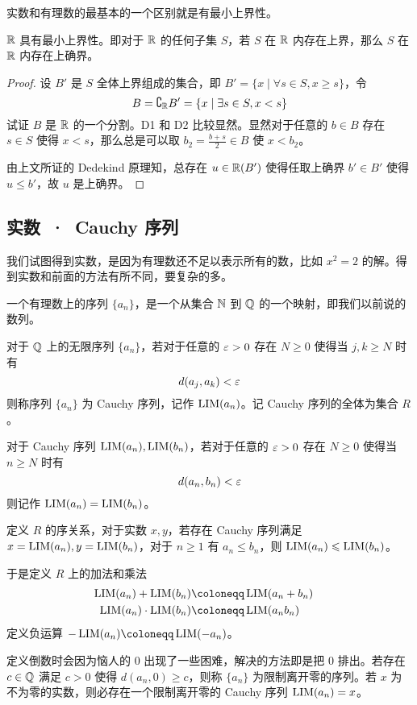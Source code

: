 实数和有理数的最基本的一个区别就是有最小上界性。

\begin{theorem}[确界原理]
	$\mathbb{R}$ 具有最小上界性。即对于 $\mathbb{R}$ 的任何子集 $S$，若 $S$ 在 $\mathbb{R}$ 内存在上界，那么 $S$ 在 $\mathbb{R}$ 内存在上确界。
\end{theorem}
\begin{proof}
	设 $B'$ 是 $S$ 全体上界组成的集合，即 $B' = \{x \mid\forall s \in S, x \geqslant s \}$，令
	\[ B = \complement_{\mathbb{R}} B' = \{ x \mid \exists s \in S, x < s\} \]
	试证 $B$ 是 $\mathbb{R}$ 的一个分割。D1 和 D2 比较显然。显然对于任意的 $b \in B$ 存在 $s \in S$ 使得 $x < s$，那么总是可以取 $b_2 = \frac{b+s}{2} \in B$ 使 $x < b_2$。

	由上文所证的 Dedekind 原理知，总存在 $u \in \mathbb{R}(B')$ 使得任取上确界 $b' \in B'$ 使得 $u \leqslant b'$，故 $u$ 是上确界。
\end{proof}

\subsection{实数\ ·\ Cauchy 序列}

我们试图得到实数，是因为有理数还不足以表示所有的数，比如 $x^2=2$ 的解。得到实数和前面的方法有所不同，要复杂的多。

一个有理数上的序列 $\{a_n\}$，是一个从集合 $\mathbb{N}$ 到 $\mathbb{Q}$ 的一个映射，即我们以前说的数列。

对于 $\mathbb{Q}$ 上的无限序列 $\{a_n\}$，若对于任意的 $\varepsilon > 0$ 存在 $N \geqslant 0$ 使得当 $j,k \geqslant N$ 时有
$$d(a_j,a_k) < \varepsilon$$
则称序列 $\{a_n\}$ 为 Cauchy 序列，记作 $\operatorname{{LIM}}(a_n)$。记 Cauchy 序列的全体为集合 $R$。

对于 Cauchy 序列 $\operatorname{{LIM}}(a_n),\operatorname{{LIM}}(b_n)$，若对于任意的 $\varepsilon > 0$ 存在 $N \geqslant 0$ 使得当 $n \geqslant N$ 时有
$$d(a_n,b_n) < \varepsilon$$
则记作 $\operatorname{{LIM}}(a_n) = \operatorname{{LIM}}(b_n)$。

定义 $R$ 的序关系，对于实数 $x,y$，若存在 Cauchy 序列满足 $x=\operatorname{{LIM}}(a_n),y=\operatorname{{LIM}}(b_n)$，对于 $n\geqslant 1$ 有 $a_n \leqslant b_n$，则 $\operatorname{{LIM}}(a_n) \leqslant \operatorname{{LIM}}(b_n)$。

于是定义 $R$ 上的加法和乘法
\[ \begin{aligned}
		\LIM(a_n) + \LIM(b_n)     & \coloneqq  \LIM(a_n+b_n) & \\
		\LIM(a_n) \cdot \LIM(b_n) & \coloneqq  \LIM(a_nb_n)    \\
	\end{aligned} \]
定义负运算 $-\LIM(a_n) \coloneqq  \LIM(-a_n)$。

定义倒数时会因为恼人的 $0$ 出现了一些困难，解决的方法即是把 $0$ 排出。若存在 $c\in \mathbb{Q}$ 满足 $c > 0$ 使得 $d(a_n,0) \geqslant c$，则称 $\{a_n\}$ 为限制离开零的序列。若 $x$ 为不为零的实数，则必存在一个限制离开零的 Cauchy 序列 $\operatorname{{LIM}}(a_n) = x$。

